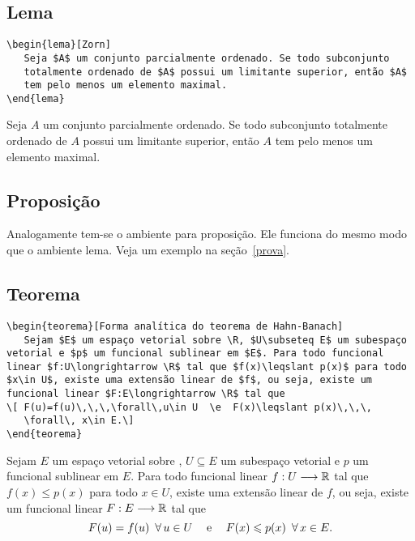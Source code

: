 \subsection{Lema}
\begin{tcolorbox}
\begin{lstlisting}
\begin{lema}[Zorn]
   Seja $A$ um conjunto parcialmente ordenado. Se todo subconjunto
   totalmente ordenado de $A$ possui um limitante superior, então $A$
   tem pelo menos um elemento maximal.
\end{lema}
\end{lstlisting}
	\tcblower
\begin{lema}[Zorn]
	Seja $A$ um conjunto parcialmente ordenado. Se todo subconjunto
	totalmente ordenado de $A$ possui um limitante superior, então $A$
	tem pelo menos um elemento maximal.
\end{lema}
\end{tcolorbox}

\subsection{Proposição}

Analogamente tem-se o ambiente  para proposição. Ele funciona do 
mesmo modo que o ambiente lema. Veja um exemplo na seção~\ref{prova}.

\subsection{Teorema}
\begin{tcolorbox}[breakable]
\begin{lstlisting}
\begin{teorema}[Forma analítica do teorema de Hahn-Banach]
   Sejam $E$ um espaço vetorial sobre \R, $U\subseteq E$ um subespaço vetorial e $p$ um funcional sublinear em $E$. Para todo funcional linear $f:U\longrightarrow \R$ tal que $f(x)\leqslant p(x)$ para todo $x\in U$, existe uma extensão linear de $f$, ou seja, existe um funcional linear $F:E\longrightarrow \R$ tal que
\[ F(u)=f(u)\,\,\,\forall\,u\in U  \e  F(x)\leqslant p(x)\,\,\,
   \forall\, x\in E.\]
\end{teorema}
\end{lstlisting}
	\tcblower
	\begin{teorema}
		Sejam $E$ um espaço vetorial sobre \R, $U\subseteq E$ um subespaço vetorial e $p$ um funcional sublinear em $E$. Para todo funcional linear $f:U\longrightarrow \mathbb{R}$ tal que $f(x)\leqslant p(x)$ para todo $x\in U$, existe uma extensão linear de $f$, ou seja, existe um funcional linear $F:E\longrightarrow \mathbb{R}$ tal que
		\[
		 F(u)=f(u)\,\,\,\forall\,u\in U  \hspace{1.25em}\hbox{e}\hspace{1.25em}  F(x)\leqslant p(x)\,\,\,
		 \forall\, x\in E.
		\]
	\end{teorema}
\end{tcolorbox}

